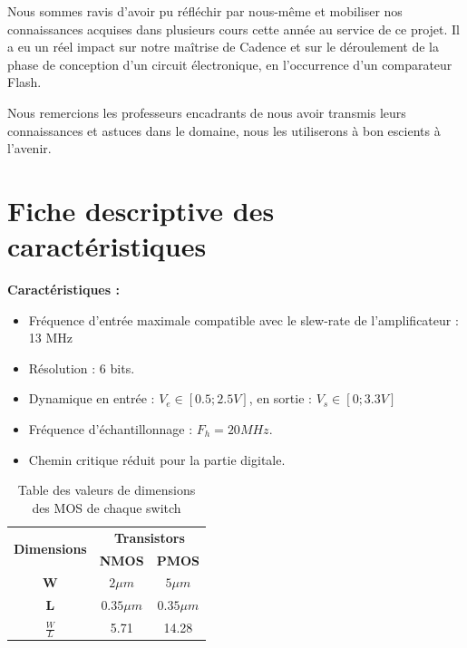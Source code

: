 \documentclass[11pt]{article}
\begin{document}
Nous sommes ravis d'avoir pu r\'efl\'echir par nous-m\^eme et mobiliser nos connaissances acquises dans plusieurs cours cette ann\'ee au service
de ce projet. Il a eu un r\'eel impact sur notre maîtrise de Cadence et sur le d\'eroulement de la phase de conception d'un circuit \'electronique,
en l'occurrence d'un comparateur Flash.

Nous remercions les professeurs encadrants de nous avoir transmis leurs connaissances et astuces dans le domaine, nous les utiliserons
\`a bon escients \`a l'avenir.

\clearpage

\section{Fiche descriptive des caract\'eristiques}

\textbf{Caract\'eristiques :}
\begin{itemize} \itemsep -2pt
\item Fr\'equence d'entr\'ee maximale compatible avec le slew-rate de l'amplificateur : 13 MHz
\item R\'esolution : 6 bits.
\item Dynamique en entr\'ee : $V_e \in [0.5 ; 2.5 V]$, en sortie : $V_s \in [0; 3.3V]$
\item Fr\'equence d'\'echantillonnage : $F_h = 20 MHz$.
\item Chemin critique r\'eduit pour la partie digitale.
\end{itemize}

\begin{table}[!htb]
\centering
\label{tab:table1}
\begin{tabular}{|c|c|c|}
\hline
\multirow{2}{*}{\textbf{Dimensions}} & \multicolumn{2}{c|}{\textbf{Transistors}} \\ \cline{2-3} 
                                     & \textbf{NMOS}       & \textbf{PMOS}       \\ \hline
\textbf{W}                           & $2 \mu m$           & $5 \mu m$           \\ \hline
\textbf{L}                           & $0.35 \mu m$        & $0.35 \mu m$        \\ \hline
\textbf{$\frac{W}{L}$}               & 5.71                & 14.28               \\ \hline
\end{tabular}
\caption{Table des valeurs de dimensions des MOS de chaque switch}
\end{table}
\end{document}
